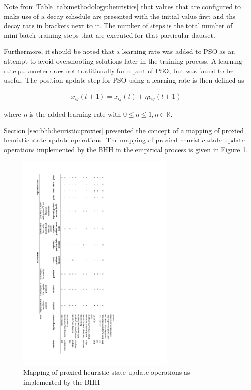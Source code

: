 Note from Table \ref{tab:methodology:heuristics} that values that are configured to make use of a decay schedule are presented with the initial value first and the decay rate in brackets next to it. The number of steps is the total number of mini-batch training steps that are executed for that particular dataset.

Furthermore, it should be noted that a learning rate was added to \acs{PSO} as an attempt to avoid overshooting solutions later in the training process. A learning rate parameter does not traditionally form part of \acs{PSO}, but was found to be useful. The position update step for \acs{PSO} using a learning rate is then defined as

\begin{equation}
      \label{eq:heuristics:pso:position_learning_rate}
      \begin{split}
            x_{ij}(t+1) = x_{ij}(t) + \eta v_{ij}(t+1)
      \end{split}
\end{equation}

where $\eta$ is the added learning rate with $0 \leq \eta \leq 1, \eta \in \mathbb{R}$.

Section \ref{sec:bhh:heuristic:proxies} presented the concept of a mapping of proxied heuristic state update operations. The mapping of proxied heuristic state update operations implemented by the \acs{BHH} in the empirical process is given in Figure \ref{fig:methodology:heuristics:proxies}.


\begin{figure}[htbp]
      \centering
      \includegraphics[width=0.7\textwidth]{images/bhh_heuristic_proxies.pdf}
      \caption{Mapping of proxied heuristic state update operations as implemented by the \acs{BHH}}
      \label{fig:methodology:heuristics:proxies}%
\end{figure}



